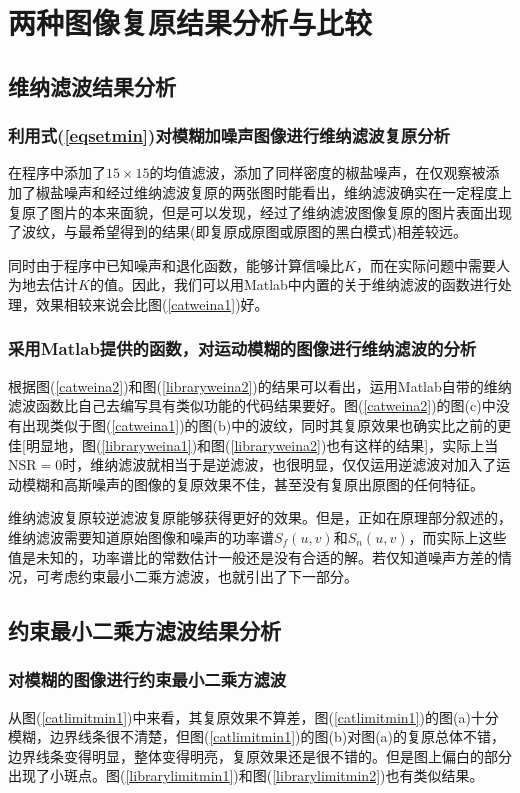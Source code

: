 \documentclass[UTF8]{ctexart}
\begin{document}
    \section{两种图像复原结果分析与比较}
    \subsection{维纳滤波结果分析}
    \subsubsection{利用式(\ref{eqsetmin})对模糊加噪声图像进行维纳滤波复原分析}
    在程序中添加了$15 \times 15$的均值滤波，添加了同样密度的椒盐噪声，在仅观察被添加了椒盐噪声和经过维纳滤波复原的两张图时能看出，维纳滤波确实在一定程度上复原了图片的本来面貌，但是可以发现，经过了维纳滤波图像复原的图片表面出现了波纹，与最希望得到的结果(即复原成原图或原图的黑白模式)相差较远。

    同时由于程序中已知噪声和退化函数，能够计算信噪比$K$，而在实际问题中需要人为地去估计$K$的值。因此，我们可以用Matlab中内置的关于维纳滤波的函数进行处理，效果相较来说会比图(\ref{catweina1})好。
    \subsubsection{采用Matlab提供的函数，对运动模糊的图像进行维纳滤波的分析}
    根据图(\ref{catweina2})和图(\ref{libraryweina2})的结果可以看出，运用Matlab自带的维纳滤波函数比自己去编写具有类似功能的代码结果要好。图(\ref{catweina2})的图(c)中没有出现类似于图(\ref{catweina1})的图(b)中的波纹，同时其复原效果也确实比之前的更佳[明显地，图(\ref{libraryweina1})和图(\ref{libraryweina2})也有这样的结果]，实际上当$\text{NSR}=0$时，维纳滤波就相当于是逆滤波，也很明显，仅仅运用逆滤波对加入了运动模糊和高斯噪声的图像的复原效果不佳，甚至没有复原出原图的任何特征。

    维纳滤波复原较逆滤波复原能够获得更好的效果。但是，正如在原理部分叙述的，维纳滤波需要知道原始图像和噪声的功率谱$S_f(u,v)$和$S_n(u,v)$，而实际上这些值是未知的，功率谱比的常数估计一般还是没有合适的解。若仅知道噪声方差的情况，可考虑约束最小二乘方滤波，也就引出了下一部分。
    \subsection{约束最小二乘方滤波结果分析}
    \subsubsection{对模糊的图像进行约束最小二乘方滤波}
    从图(\ref{catlimitmin1})中来看，其复原效果不算差，图(\ref{catlimitmin1})的图(a)十分模糊，边界线条很不清楚，但图(\ref{catlimitmin1})的图(b)对图(a)的复原总体不错，边界线条变得明显，整体变得明亮，复原效果还是很不错的。但是图上偏白的部分出现了小斑点。图(\ref{librarylimitmin1})和图(\ref{librarylimitmin2})也有类似结果。
\end{document}
